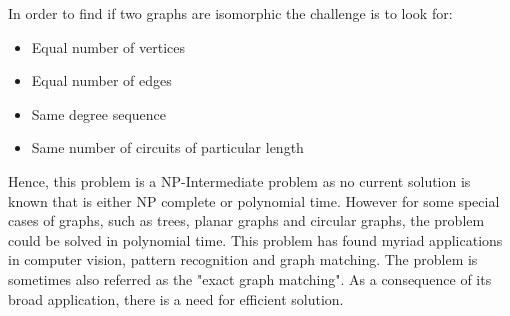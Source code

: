 \documentclass[a4paper]{article}
\begin{document}
In order to find if two graphs are isomorphic the challenge is to look for:\\
\begin{itemize}
\item Equal number of vertices \\
\item Equal number of edges\\
\item Same degree sequence\\
\item Same number of circuits of particular length\\
\end{itemize}
Hence, this problem is a NP-Intermediate problem as no current solution is known that is either NP complete or polynomial time. However for some special cases of graphs, such as trees, planar graphs and circular graphs, the problem could be solved in polynomial time. This problem has found myriad applications in computer vision, pattern recognition and graph matching. The problem is sometimes also referred as the "exact graph matching".  As a consequence of its broad application, there is a need for efficient solution. \\
\end{document}
